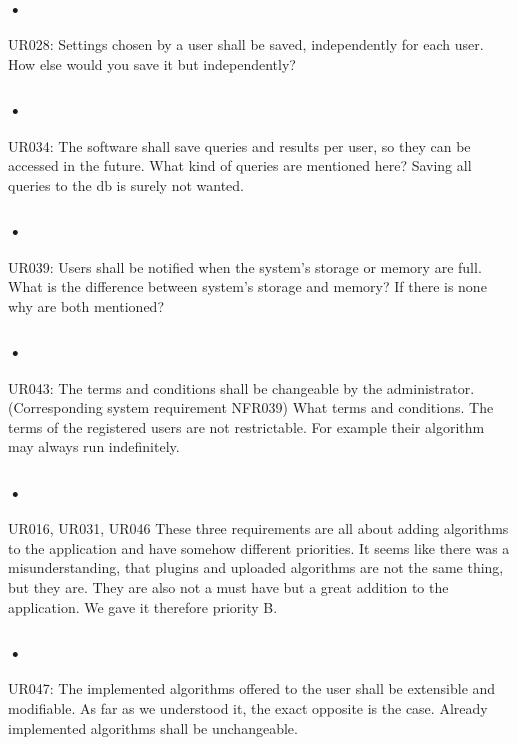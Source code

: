 \documentclass{article}
\begin{document}
\subsubsection{•}
UR028: Settings chosen by a user shall be saved, independently for each user.
How else would you save it but independently?

\subsubsection{•}
UR034: The software shall save queries and results per user, so they can be accessed in the future.
What kind of queries are mentioned here? Saving all queries to the db is surely not wanted.

\subsubsection{•}
UR039: Users shall be notified when the system’s storage or memory are full.
What is the difference between system’s storage and memory? If there is none why are both mentioned?

\subsubsection{•}
UR043: The terms and conditions shall be changeable by the administrator. (Corresponding system requirement NFR039)
What terms and conditions. The terms of the registered users are not restrictable. For example their algorithm may always run indefinitely.

\subsubsection{•}
UR016, UR031, UR046
These three requirements are all about adding algorithms to the application and have somehow different priorities. It seems like there was a misunderstanding, that plugins and uploaded algorithms are not the same thing, but they are. They are also not a must have but a great addition to the application. We gave it therefore priority B.

\subsubsection{•}
UR047: The implemented algorithms offered to the user shall be extensible and modifiable.
As far as we understood it, the exact opposite is the case. Already implemented algorithms shall be unchangeable.
\end{document}
